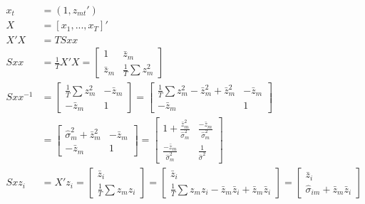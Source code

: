 \documentclass[]{article}
\begin{document}
\begin{align*}
	x_t &= (1, z_{mt}') \\
	X &= [x_1, ..., x_T]' \\
	X'X &= T Sxx\\
	Sxx &= \frac{1}{T}X'X = \left[\begin{array}{cc}
		1 & \bar{z}_m \\
		\bar{z}_m & \frac{1}{T}\sum{z_m^2}
	\end{array}\right] \\	
	Sxx^{-1} &= \left[\begin{array}{cc}
		\frac{1}{T}\sum{z_m^2} & -\bar{z}_m \\
		-\bar{z}_m & 1
	\end{array}\right] = \left[\begin{array}{cc}
		\frac{1}{T}\sum{z_m^2} - \bar{z}_m^2 + \bar{z}_m^2 & -\bar{z}_m \\
		-\bar{z}_m & 1
	\end{array}\right]\\
	&= \left[\begin{array}{cc}
		\hat{\sigma}_m^2 + \bar{z}_m^2 & -\bar{z}_m \\
		-\bar{z}_m & 1
	\end{array}\right] = \left[\begin{array}{cc}
		1 + \frac{\bar{z}_m^2}{\hat{\sigma}_m^2} & \frac{-\bar{z}_m}{\hat{\sigma}_m^2} \\
		\frac{-\bar{z}_m}{\hat{\sigma}_m^2} & \frac{1}{\hat{\sigma}^2}
	\end{array}\right]\\
	Sxz_i &= X'z_i = \left[\begin{array}{c}
		\bar{z}_i \\
		\frac{1}{T}\sum{z_m z_i}
	\end{array}\right] = \left[\begin{array}{c}
		\bar{z}_i \\
		\frac{1}{T}\sum{z_m z_i} - \bar{z}_m \bar{z}_i + \bar{z}_m \bar{z}_i
	\end{array}\right] = \left[\begin{array}{c}
		\bar{z}_i \\
		\hat{\sigma}_{im} + \bar{z}_m \bar{z}_i 
	\end{array}\right] \\
\end{align*}
\end{document}
